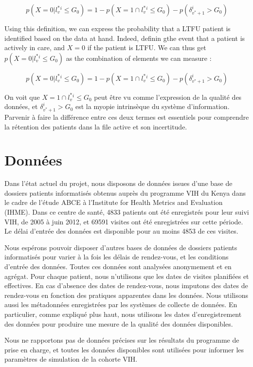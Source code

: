 \documentclass[paper=a4, fontsize=11pt]{scrartcl}
\numberwithin{equation}{section}		%
\numberwithin{figure}{section}			%
\numberwithin{table}{section}				%
\begin{document}
$$p(X = 0 | l_v^{*}^i \leq  G_0) = 1 - p(X = 1  \cap l_v^{*}^i \leq  G_0) - p(\delta_{v^*+1}^i > G_0) $$

Using this definition, we can express the probability that a LTFU patient is identified based on the data at hand. Indeed, definin gthe event that a patient is actively in care, and $X = 0$ if the patient is LTFU. We can thus get $p(X = 0 | l_v^{*}^i \leq  G_0)$ as the combination of elements we can measure :

$$p(X = 0 | l_v^{*}^i \leq  G_0) = 1 - p(X = 1  \cap l_v^{*}^i \leq  G_0) - p(\delta_{v^*+1}^i > G_0) $$

On voit que $X = 1  \cap l_v^{*}^i \leq  G_0$ peut être vu comme l'expression de la qualité des données, et $\delta_{v^*+1}^i > G_0$ est la myopie intrinsèque du système d'information. Parvenir à faire la différence entre ces deux termes est essentiels pour comprendre la rétention des patients dans la file active et son incertitude.

\section{Données}

Dans l'état actuel du projet, nous disposons de données issues d'une base de dossiers patients informatisés obtenus auprès du programme VIH du Kenya dans le cadre de l'étude ABCE à l'Institute for Health Metrics and Evaluation (IHME). Dans ce centre de santé, 4833 patients ont été enregistrés pour leur suivi VIH, de 2005 à juin 2012, et 69591 visites ont été enregistrées sur cette période. Le délai d'entrée des données est disponible pour au moins 4853 de ces visites.

Nous espérons pouvoir disposer d'autres bases de données de dossiers patients informatisés pour varier à la fois les délais de rendez-vous, et les conditions d'entrée des données. Toutes ces données sont analysées anonymement et en agrégat. Pour chaque patient, nous n'utilisons que les dates de visites planifiées et effectives. En cas d'absence des dates de rendez-vous, nous imputons des dates de rendez-vous en fonction des pratiques apparentes dans les données. Nous utilisons aussi les métadonnées enregistrées par les systèmes de collecte de données. En particulier, comme expliqué plus haut, nous utilisons les dates d'enregistrement des données pour produire une mesure de la qualité des données disponibles.

Nous ne rapportons pas de données précises sur les résultats du programme de prise en charge, et toutes les données disponibles sont utilisées pour informer les paramètres de simulation de la cohorte VIH.
\end{document}
